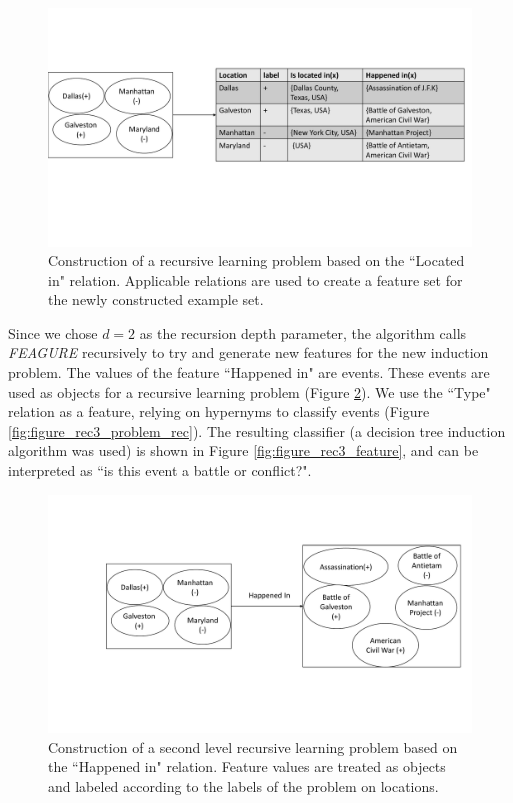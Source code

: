 \documentclass[letterpaper]{article} %
\theoremstyle{definition}
\begin{document}
\begin{figure}[!h]
	\centering
	\includegraphics[width=\linewidth]{figure_rec3_problem_new}
	\caption{Construction of a recursive learning problem based on the ``Located in" relation. Applicable relations are used to create a feature set for the newly constructed example set.}
	\label{fig:figure_rec3_problem}
\end{figure}

Since we chose $d=2$ as the recursion depth parameter, the algorithm calls \emph{FEAGURE} recursively to try and generate new features for the new induction problem.
The values of the feature ``Happened in" are events. These events are used as objects for a recursive learning problem (Figure \ref{fig:figure_rec3_example_rec}).
We use the ``Type" relation as a feature, relying on hypernyms to classify events (Figure \ref{fig:figure_rec3_problem_rec}).
The resulting classifier (a decision tree induction algorithm was used) is shown in Figure \ref{fig:figure_rec3_feature}, and can be interpreted as ``is this event a battle or conflict?".

\begin{figure}[!h]
	\centering
	\includegraphics[width=\linewidth]{figure_rec3_example_rec_new}
	\caption{Construction of a second level recursive learning problem based on the ``Happened in" relation. Feature values are treated as objects and labeled according to the labels of the problem on locations.}
	\label{fig:figure_rec3_example_rec}
\end{figure}
\end{document}
